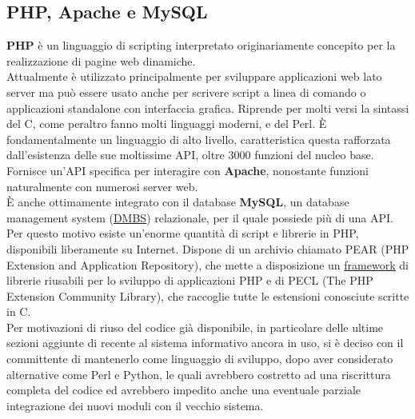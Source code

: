 \subsection{PHP, Apache e MySQL}
\textbf{PHP} \`e un linguaggio di scripting interpretato originariamente concepito per la realizzazione di pagine web dinamiche. \\
Attualmente \`e utilizzato principalmente per sviluppare applicazioni web lato server ma pu\`o essere usato anche per scrivere script a linea di comando o applicazioni standalone con interfaccia grafica. Riprende per molti versi la sintassi del C, come peraltro fanno molti linguaggi moderni, e del Perl. \`E fondamentalmente un linguaggio di alto livello, caratteristica questa rafforzata dall'esistenza delle sue moltissime API, oltre 3000 funzioni del nucleo base. \\
Fornisce un'API specifica per interagire con \textbf{Apache}, nonostante funzioni naturalmente con numerosi server web.\\
\`E anche ottimamente integrato con il database \textbf{MySQL}, un database management system (\hyperlink{dbms}{\underline{DMBS}}) relazionale, per il quale possiede pi\`u di una API. \\
Per questo motivo esiste un'enorme quantit\`a di script e librerie in PHP, disponibili liberamente su Internet. Dispone di un archivio chiamato PEAR (PHP Extension and Application Repository), che mette a disposizione un \hyperlink{framework}{\underline{framework}} di librerie riusabili per lo sviluppo di applicazioni PHP e di PECL (The PHP Extension Community Library), che raccoglie tutte le estensioni conosciute scritte in C. \\
Per motivazioni di riuso del codice gi\`a disponibile, in particolare delle ultime sezioni aggiunte di recente al sistema informativo ancora in uso, si \`e deciso con il committente di mantenerlo come linguaggio di sviluppo, dopo aver considerato alternative come Perl e Python, le quali avrebbero costretto ad una riscrittura completa del codice ed avrebbero impedito anche una eventuale parziale integrazione dei nuovi moduli con il vecchio sistema.

